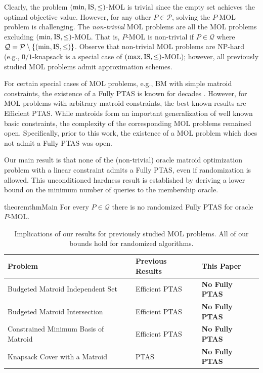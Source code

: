 \documentclass[11pt,letter]{article}
\newcommand{\IS}{\textnormal{IS}}
\newcommand{\cQ}{{\mathcal{Q}}}
\newcommand{\cP}{{\mathcal{P}}}
\begin{document}
Clearly, the problem $(\min,\IS,\leq)$-MOL is trivial since the empty set achieves the optimal objective value. 
However, for any other $P \in \cP$, solving the $P$-MOL problem is challenging.
The {\em non-trivial} MOL problems are all the MOL problems excluding $(\min,\IS,\leq)$-MOL. That is, $P$-MOL is non-trivial if $P\in \cQ$ where  $\cQ = \cP \setminus \{(\min,\IS,\leq)\}$.
 Observe that non-trivial MOL problems are NP-hard (e.g., $0/1${\sc-knapsack} is a special case of $(\max,\IS,\leq)$-MOL);
however, %
all previously studied MOL problems admit approximation schemes.




For certain special cases of MOL problems, e.g., BM with simple matroid constraints,
the existence of a Fully PTAS is known for decades \cite{Si79,caprara2000approximation}.
However, for MOL problems with arbitrary matroid constraints, the best known results are Efficient PTAS.  While matroids form an important generalization of well known basic
constraints,
the complexity of the corresponding MOL problems remained open. Specifically, prior to this work, the existence of a MOL problem which does not admit a Fully PTAS was open.





Our main result is that none of the (non-trivial) 
oracle matroid optimization problem with a linear constraint admits 
a Fully PTAS, even if randomization is allowed. This unconditioned hardness result is established by deriving a lower bound on the minimum number of queries to the membership oracle. 

 \begin{restatable}{theorem}{thmMain}
	\label{thm:main}
	For every $P \in \cQ$ there is no randomized  \textnormal{Fully PTAS} for oracle $P$-\textnormal{MOL}. 
\end{restatable} 


\begin{table}[tbh]
	\centering
	\begin{tabular}{m{2.7in} m{1.4in} m{1.9in}}
		\toprule
		Problem & Previous Results & This Paper \\
		\midrule
		Budgeted Matroid Independent Set & Efficient PTAS \cite{DKS23} & {\bf No Fully PTAS} \\
		Budgeted Matroid Intersection & Efficient PTAS  \cite{DKS23b} & {\bf No Fully PTAS}  \\
		Constrained Minimum Basis of Matroid & Efficient PTAS  \cite{HL04} & {\bf No Fully PTAS} \\
		Knapsack Cover with a Matroid & PTAS \cite{CCNR13} & {\bf No Fully PTAS}  \\
		\bottomrule
	\end{tabular}
	\caption{Implications of our results for previously studied MOL problems. All of our bounds hold for randomized algorithms. }
	\label{tab:results}
\end{table}
\end{document}
